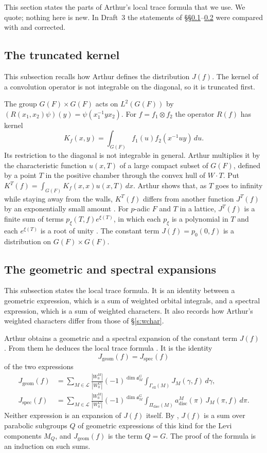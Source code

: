 \documentclass[12pt,letterpaper]{article}
\numberwithin{equation}{section}
\theoremstyle{plain}
\theoremstyle{definition}
\theoremstyle{remark}
\newcommand{\cL}{\mathcal{L}}
\newcommand{\fa}{\mathfrak{a}}
\newcommand{\ellr}{\mathrm{ell}}
\begin{document}
This section states the parts of Arthur's local trace formula that we use. We quote; nothing here is new. In Draft~3 the statements of \S\S\ref{s:trunc}--\ref{s:expansions} were compared with \cite{Ar91} and corrected.

\subsection{The truncated kernel}\label{s:trunc}

This subsection recalls how Arthur defines the distribution $J(f)$. The kernel of a convolution operator is not integrable on the diagonal, so it is truncated first.

The group $G(F)\times G(F)$ acts on $L^2(G(F))$ by $(R(x_1,x_2)\psi)(y)=\psi(x_1^{-1}yx_2)$. For $f=f_1\otimes f_2$ the operator $R(f)$ has kernel
\[
K_f(x,y)=\int_{G(F)}f_1(u)f_2(x^{-1}uy)\,du.
\]
Its restriction to the diagonal is not integrable in general. Arthur multiplies it by the characteristic function $u(x,T)$ of a large compact subset of $G(F)$, defined by a point $T$ in the positive chamber through the convex hull of $W\cdot T$. Put $K^T(f)=\int_{G(F)}K_f(x,x)u(x,T)\,dx$. Arthur shows that, as $T$ goes to infinity while staying away from the walls, $K^T(f)$ differs from another function $J^T(f)$ by an exponentially small amount \cite[Prop.~4.5]{Ar91}. For $p$-adic $F$ and $T$ in a lattice, $J^T(f)$ is a finite sum of terms $p_\xi(T,f)e^{\xi(T)}$, in which each $p_\xi$ is a polynomial in $T$ and each $e^{\xi(T)}$ is a root of unity \cite[Prop.~6.1]{Ar91}. The constant term $J(f)=p_0(0,f)$ is a distribution on $G(F)\times G(F)$.

\subsection{The geometric and spectral expansions}\label{s:expansions}

This subsection states the local trace formula. It is an identity between a geometric expression, which is a sum of weighted orbital integrals, and a spectral expression, which is a sum of weighted characters. It also records how Arthur's weighted characters differ from those of \S\ref{s:wchar}.

Arthur obtains a geometric and a spectral expansion of the constant term $J(f)$ \cite[Props.~6.1 and~11.3]{Ar91}. From them he deduces the local trace formula \cite[Thm.~12.2]{Ar91}. It is the identity
\[
J_{\mathrm{geom}}(f)=J_{\mathrm{spec}}(f)
\]
of the two expressions
\begin{align}
J_{\mathrm{geom}}(f)&=\sum_{M\in\cL}\frac{|W_0^M|}{|W_0^G|}(-1)^{\dim\fa_M^G}\int_{\Gamma_{\ellr}(M)}J_M(\gamma,f)\,d\gamma,\label{e:geo}\\
J_{\mathrm{spec}}(f)&=\sum_{M\in\cL}\frac{|W_0^M|}{|W_0^G|}(-1)^{\dim\fa_M^G}\int_{\Pi_{\mathrm{disc}}(M)}a^M_{\mathrm{disc}}(\pi)\,J_M(\pi,f)\,d\pi.\label{e:spec}
\end{align}
Neither expression is an expansion of $J(f)$ itself. By \cite[(12.13)]{Ar91}, $J(f)$ is a sum over parabolic subgroups $Q$ of geometric expressions of this kind for the Levi components $M_Q$, and $J_{\mathrm{geom}}(f)$ is the term $Q=G$. The proof of the formula is an induction on such sums.
\end{document}
